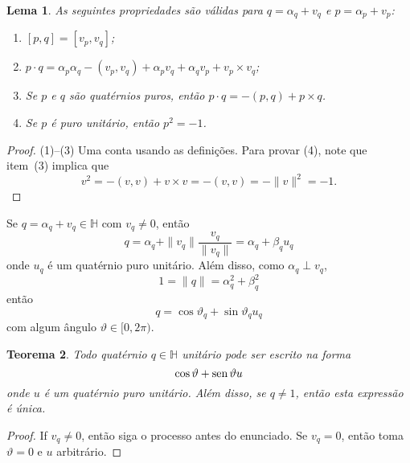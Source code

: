 \documentclass[12pt]{amsart}
\newcommand{\Ha}{\mathbb H}
\DeclareMathOperator{\sen}{\textrm{\rm sen}}
\newtheorem{theorem}{Teorema}
\newtheorem{lemma}[theorem]{Lema}
\theoremstyle{definition}
\begin{document}
\begin{lemma}
    As seguintes propriedades são válidas para $q=\alpha_q+v_q$ e $p=\alpha_p+v_p$:
    \begin{enumerate}
        \item $[p,q]=[v_p,v_q]$;
        \item $p\cdot q=\alpha_p\alpha_q-(v_p,v_q)+\alpha_p v_q+\alpha_qv_p+v_p\times v_q$;
        \item Se $p$ e $q$ são quatérnios puros, então $p\cdot q=-(p, q)+p\times q$.
        \item Se $p$ é puro unitário, então $p^2=-1$.
    \end{enumerate}
\end{lemma}
\begin{proof}
    (1)--(3) Uma conta usando as definições. Para provar (4), note que item~(3) implica que 
    \[
        v^2=-(v, v)+v\times v=-(v, v)=-\|v\|^2=-1. 
    \]
\end{proof}


Se $q=\alpha_q+v_q\in\Ha$ com $v_q\neq 0$, então 
\[
    q=\alpha_q+\|v_q\|\frac{v_q}{\|v_q\|}=\alpha_q+\beta_qu_q
\]
onde $u_q$ é um quatérnio puro unitário. Além disso, como $\alpha_q\perp v_q$,
\[
    1=\|q\|=\alpha_q^2+\beta_q^2
\]
então 
\[
    q=\cos\vartheta_q+\sin\vartheta_qu_q
\]
com algum ângulo $\vartheta\in[0,2\pi)$.

\begin{theorem}
    Todo quatérnio $q\in\Ha$ unitário pode ser escrito na forma 
    \[
        \cos\vartheta +\sen\vartheta u
    \]
    onde $u$ é um quatérnio puro unitário.
    Além disso, se $q\neq 1$, então esta expressão é única.
\end{theorem}
\begin{proof}
    If $v_q\neq 0$, então siga o processo antes do enunciado. Se $v_q=0$, então toma $\vartheta=0$ e $u$ arbitrário.
\end{proof}
\end{document}
